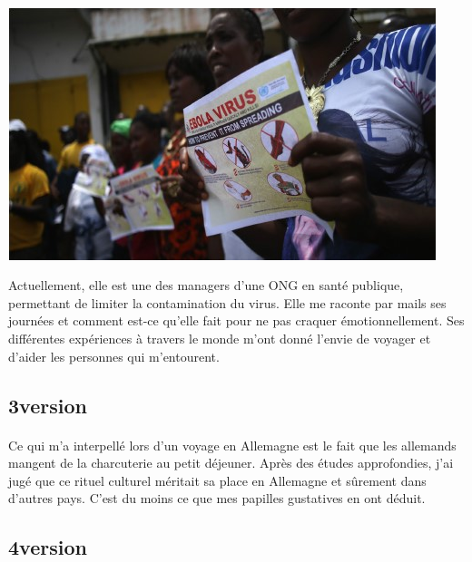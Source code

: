\paragraph{}
\begin{center}
\includegraphics[scale=0.7]{Afrique2.jpg}
\end{center}
Actuellement, elle est une des managers d'une ONG en santé publique, permettant de limiter la contamination du virus. Elle me raconte par mails ses journées et comment est-ce qu'elle fait pour ne pas craquer émotionnellement. Ses différentes expériences à travers le monde m'ont donné l'envie de voyager et d'aider les personnes qui m'entourent.

\subsection{3\ieme version}
\paragraph{}
Ce qui m'a interpellé lors d'un voyage en Allemagne est le fait que les allemands mangent de la charcuterie au petit déjeuner. Après des études approfondies, j'ai jugé que ce rituel culturel méritait sa place en Allemagne et sûrement dans d'autres pays. C'est du moins ce que mes papilles gustatives en ont déduit.

\subsection{4\ieme version}
